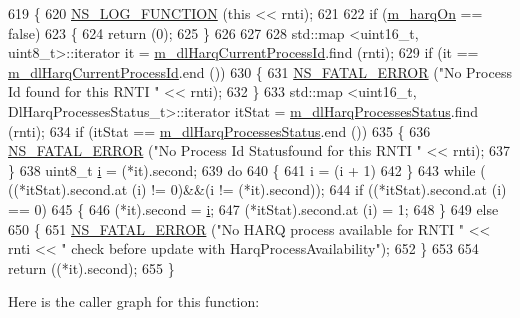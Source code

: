\begin{DoxyCode}
619 \{
620   \hyperlink{log-macros-disabled_8h_a90b90d5bad1f39cb1b64923ea94c0761}{NS\_LOG\_FUNCTION} (\textcolor{keyword}{this} << rnti);
621 
622   \textcolor{keywordflow}{if} (\hyperlink{classns3_1_1FdTbfqFfMacScheduler_afb4bf57d3b17b967f82a5b2134cd70e7}{m\_harqOn} == \textcolor{keyword}{false})
623     \{
624       \textcolor{keywordflow}{return} (0);
625     \}
626 
627 
628   std::map <uint16\_t, uint8\_t>::iterator it = \hyperlink{classns3_1_1FdTbfqFfMacScheduler_a62be9c7aa20ef5d6994f9aa927f73858}{m\_dlHarqCurrentProcessId}.find (rnti);
629   \textcolor{keywordflow}{if} (it == \hyperlink{classns3_1_1FdTbfqFfMacScheduler_a62be9c7aa20ef5d6994f9aa927f73858}{m\_dlHarqCurrentProcessId}.end ())
630     \{
631       \hyperlink{group__fatal_ga5131d5e3f75d7d4cbfd706ac456fdc85}{NS\_FATAL\_ERROR} (\textcolor{stringliteral}{"No Process Id found for this RNTI "} << rnti);
632     \}
633   std::map <uint16\_t, DlHarqProcessesStatus\_t>::iterator itStat = 
      \hyperlink{classns3_1_1FdTbfqFfMacScheduler_abc7e2984f379ab5a1855d815c439fa4f}{m\_dlHarqProcessesStatus}.find (rnti);
634   \textcolor{keywordflow}{if} (itStat == \hyperlink{classns3_1_1FdTbfqFfMacScheduler_abc7e2984f379ab5a1855d815c439fa4f}{m\_dlHarqProcessesStatus}.end ())
635     \{
636       \hyperlink{group__fatal_ga5131d5e3f75d7d4cbfd706ac456fdc85}{NS\_FATAL\_ERROR} (\textcolor{stringliteral}{"No Process Id Statusfound for this RNTI "} << rnti);
637     \}
638   uint8\_t \hyperlink{bernuolliDistribution_8m_a6f6ccfcf58b31cb6412107d9d5281426}{i} = (*it).second;
639   \textcolor{keywordflow}{do}
640     \{
641       i = (i + 1) %
642     \}
643   \textcolor{keywordflow}{while} ( ((*itStat).second.at (i) != 0)&&(i != (*it).second));
644   \textcolor{keywordflow}{if} ((*itStat).second.at (i) == 0)
645     \{
646       (*it).second = \hyperlink{bernuolliDistribution_8m_a6f6ccfcf58b31cb6412107d9d5281426}{i};
647       (*itStat).second.at (i) = 1;
648     \}
649   \textcolor{keywordflow}{else}
650     \{
651       \hyperlink{group__fatal_ga5131d5e3f75d7d4cbfd706ac456fdc85}{NS\_FATAL\_ERROR} (\textcolor{stringliteral}{"No HARQ process available for RNTI "} << rnti << \textcolor{stringliteral}{" check before update
       with HarqProcessAvailability"});
652     \}
653 
654   \textcolor{keywordflow}{return} ((*it).second);
655 \}
\end{DoxyCode}


Here is the caller graph for this function\+:


